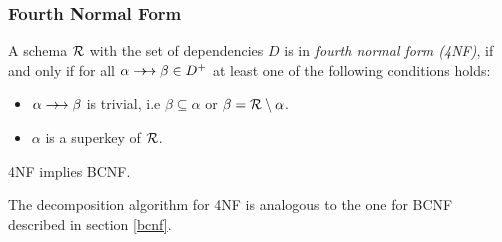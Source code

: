 \subsubsection{Fourth Normal Form}

A schema $\mathcal{R}$ with the set of dependencies $D$ is in \emph{fourth normal form (4NF)}, if and only if for all $\alpha \rightarrow\!\!\rightarrow \beta \in D^+$ at least one of the following conditions holds:
\begin{itemize}
\item $\alpha \rightarrow\!\!\rightarrow \beta$ is trivial, i.e $\beta \subseteq \alpha$ or $\beta = \mathcal{R}\setminus\alpha$.
\item $\alpha$ is a superkey of $\mathcal{R}$.
\end{itemize}

\begin{note}
4NF implies BCNF.
\end{note}

The decomposition algorithm for 4NF is analogous to the one for BCNF described in section \ref{bcnf}.


